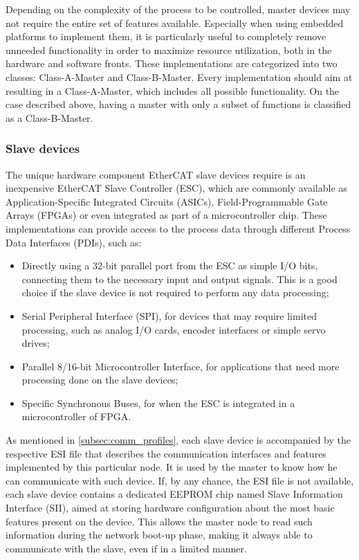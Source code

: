 Depending on the complexity of the process to be controlled, master devices may not require the entire set of features available.
Especially when using embedded platforms to implement them, it is particularly useful to completely remove unneeded functionality in order to maximize resource utilization, both in the hardware and software fronts.
These implementations are categorized into two classes: Class-A-Master and Class-B-Master.
Every implementation should aim at resulting in a Class-A-Master, which includes all possible functionality.
On the case described above, having a master with only a subset of functions is classified as a Class-B-Master.

\subsubsection{Slave devices} \label{subsubsec:slave_devices}

The unique hardware component EtherCAT slave devices require is an inexpensive EtherCAT Slave Controller (ESC), which are commonly available as Application-Specific Integrated Circuits (ASICs), Field-Programmable Gate Arrays (FPGAs) or even integrated as part of a microcontroller chip.
These implementations can provide access to the process data through different Process Data Interfaces (PDIs), such as:

\begin{itemize}
	\item Directly using a 32-bit parallel port from the ESC as simple I/O bits, connecting them to the necessary input and output signals. This is a good choice if the slave device is not required to perform any data processing;

	\item Serial Peripheral Interface (SPI), for devices that may require limited processing, such as analog I/O cards, encoder interfaces or simple servo drives;

	\item Parallel 8/16-bit Microcontroller Interface, for applications that need more processing done on the slave devices;

	\item Specific Synchronous Buses, for when the ESC is integrated in a microcontroller of FPGA.
\end{itemize}

As mentioned in \autoref{subsec:comm_profiles}, each slave device is accompanied by the respective ESI file that describes the communication interfaces and features implemented by this particular node.
It is used by the master to know how he can communicate with such device.
If, by any chance, the ESI file is not available, each slave device contains a dedicated EEPROM chip named Slave Information Interface (SII), aimed at storing hardware configuration about the most basic features present on the device.
This allows the master node to read such information during the network boot-up phase, making it always able to communicate with the slave, even if in a limited manner.

